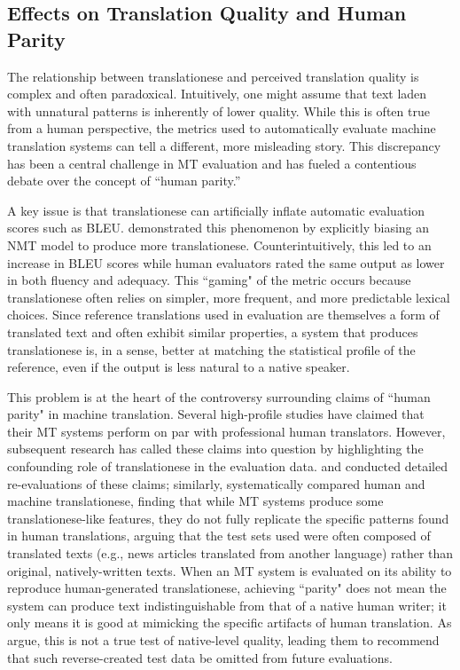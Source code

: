 \documentclass[11pt,a4paper]{article}
\begin{document}
\subsection{Effects on Translation Quality and Human Parity}

The relationship between translationese and perceived translation quality is complex and often paradoxical. Intuitively, one might assume that text laden with unnatural patterns is inherently of lower quality. While this is often true from a human perspective, the metrics used to automatically evaluate machine translation systems can tell a different, more misleading story. This discrepancy has been a central challenge in MT evaluation and has fueled a contentious debate over the concept of ``human parity.''

A key issue is that translationese can artificially inflate automatic evaluation scores such as BLEU. \citet{riley2020translationese} demonstrated this phenomenon by explicitly biasing an NMT model to produce more translationese. Counterintuitively, this led to an increase in BLEU scores while human evaluators rated the same output as lower in both fluency and adequacy. This ``gaming" of the metric occurs because translationese often relies on simpler, more frequent, and more predictable lexical choices. Since reference translations used in evaluation are themselves a form of translated text and often exhibit similar properties, a system that produces translationese is, in a sense, better at matching the statistical profile of the reference, even if the output is less natural to a native speaker.

This problem is at the heart of the controversy surrounding claims of ``human parity" in machine translation. Several high-profile studies have claimed that their MT systems perform on par with professional human translators. However, subsequent research has called these claims into question by highlighting the confounding role of translationese in the evaluation data. \citet{toral2018reassessing} and \citet{freitag2019translationese} conducted detailed re-evaluations of these claims; similarly, \citet{bizzoni2020human} systematically compared human and machine translationese, finding that while MT systems produce some translationese-like features, they do not fully replicate the specific patterns found in human translations, arguing that the test sets used were often composed of translated texts (e.g., news articles translated from another language) rather than original, natively-written texts. When an MT system is evaluated on its ability to reproduce human-generated translationese, achieving ``parity" does not mean the system can produce text indistinguishable from that of a native human writer; it only means it is good at mimicking the specific artifacts of human translation. As \citet{freitag2019translationese} argue, this is not a true test of native-level quality, leading them to recommend that such reverse-created test data be omitted from future evaluations.
\end{document}
